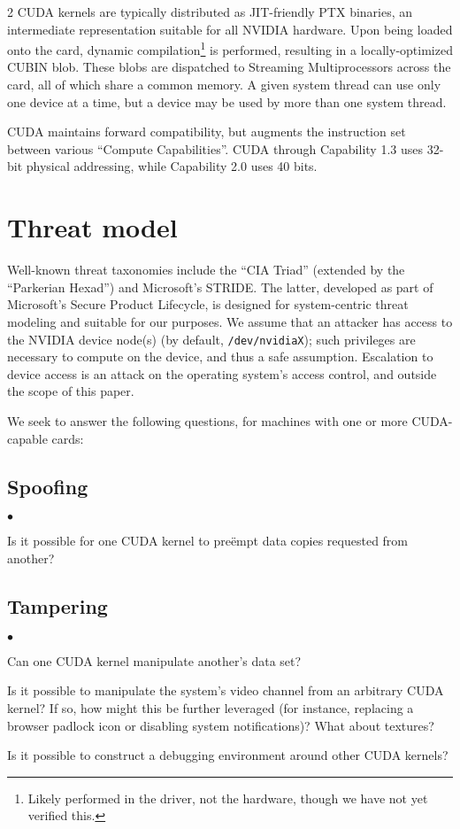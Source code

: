\documentclass[letterpaper,10pt]{article}
\newcommand{\squishlist}{\begin{list}{$\bullet$}
  {\setlength{\itemsep}{0pt}
    \setlength{\parsep}{3pt}
    \setlength{\topsep}{3pt}
    \setlength{\partopsep}{0pt}
    \setlength{\leftmargin}{1.5em}
    \setlength{\labelwidth}{1em}
    \setlength{\labelsep}{0.5em}
  } }
\newcommand{\squishend}{\end{list}}
\begin{document}
\begin{multicols}{2}
CUDA kernels are typically distributed as JIT-friendly PTX binaries\cite{kerr},
an intermediate representation suitable for all NVIDIA hardware. Upon being
loaded onto the card, dynamic compilation\footnote{Likely performed in the
driver, not the hardware, though we have not yet verified this.} is performed,
resulting in a locally-optimized CUBIN blob. These blobs are dispatched to
Streaming Multiprocessors across the card, all of which share a common memory.
A given system thread can use only one device at a time, but a device may be
used by more than one system thread.

CUDA maintains forward compatibility, but augments the instruction set
between various ``Compute Capabilities''.  CUDA through Capability 1.3 uses
32-bit physical addressing, while Capability 2.0 uses 40 bits.

\section{Threat model}
Well-known threat taxonomies include the ``CIA Triad'' (extended by the
``Parkerian Hexad\cite{sechandbook}'') and Microsoft's STRIDE\@. The latter, developed as part of
Microsoft's Secure Product Lifecycle, is designed for system-centric threat
modeling and suitable for our purposes. We assume that an attacker has access
to the NVIDIA device node(s) (by default, \texttt{/dev/nvidiaX}); such privileges
are necessary to compute on the device, and thus a safe assumption. Escalation
to device access is an attack on the operating system's access control, and
outside the scope of this paper.

We seek to answer the following questions, for machines with one or more CUDA-capable
cards:
\subsection{Spoofing}
\squishlist
\item Is it possible for one CUDA kernel to pre\"empt data copies requested
from another?
\squishend
\subsection{Tampering}
\squishlist
\item Can one CUDA kernel manipulate another's data set?
\item Is it possible to manipulate the system's video channel from an arbitrary
CUDA kernel? If so, how might this be further leveraged (for instance, replacing
a browser padlock icon or disabling system notifications)? What about textures?
\item Is it possible to construct a debugging environment around other CUDA kernels?
\squishend

\end{multicols}
\end{document}
